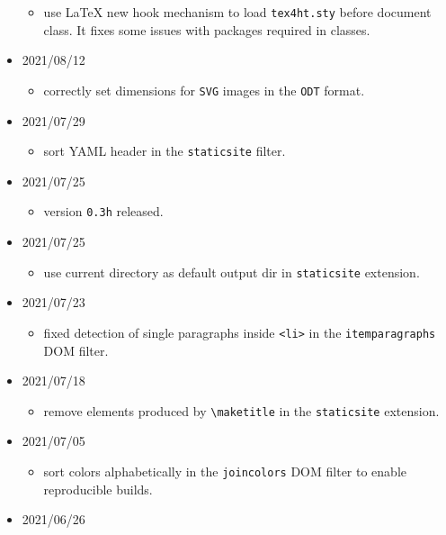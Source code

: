 \begin{itemize}
  \begin{itemize}
  \tightlist
  \item
    use LaTeX new hook mechanism to load \texttt{tex4ht.sty} before
    document class. It fixes some issues with packages required in
    classes.
  \end{itemize}
\item
  2021/08/12

  \begin{itemize}
  \tightlist
  \item
    correctly set dimensions for \texttt{SVG} images in the \texttt{ODT}
    format.
  \end{itemize}
\item
  2021/07/29

  \begin{itemize}
  \tightlist
  \item
    sort YAML header in the \texttt{staticsite} filter.
  \end{itemize}
\item
  2021/07/25

  \begin{itemize}
  \tightlist
  \item
    version \texttt{0.3h} released.
  \end{itemize}
\item
  2021/07/25

  \begin{itemize}
  \tightlist
  \item
    use current directory as default output dir in \texttt{staticsite}
    extension.
  \end{itemize}
\item
  2021/07/23

  \begin{itemize}
  \tightlist
  \item
    fixed detection of single paragraphs inside
    \texttt{\textless{}li\textgreater{}} in the \texttt{itemparagraphs}
    DOM filter.
  \end{itemize}
\item
  2021/07/18

  \begin{itemize}
  \tightlist
  \item
    remove elements produced by \texttt{\textbackslash{}maketitle} in
    the \texttt{staticsite} extension.
  \end{itemize}
\item
  2021/07/05

  \begin{itemize}
  \tightlist
  \item
    sort colors alphabetically in the \texttt{joincolors} DOM filter to
    enable reproducible builds.
  \end{itemize}
\item
  2021/06/26


\end{itemize}
